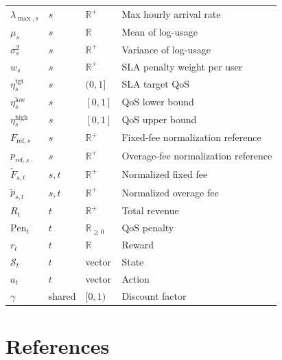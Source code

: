 \documentclass[11pt]{article}
\begin{document}
\begin{longtable}{@{}llll@{}}
$\lambda_{\max,s}$ & $s$ & $\mathbb{R}^{+}$ & Max hourly arrival rate \\
$\mu_s$ & $s$ & $\mathbb{R}$ & Mean of log-usage \\
$\sigma_s^2$ & $s$ & $\mathbb{R}^{+}$ & Variance of log-usage \\
$w_s$ & $s$ & $\mathbb{R}^{+}$ & SLA penalty weight per user \\
$\eta_s^{\mathrm{tgt}}$ & $s$ & $(0,1]$ & SLA target QoS \\
$\eta_s^{\mathrm{low}}$ & $s$ & $[0,1]$ & QoS lower bound \\
$\eta_s^{\mathrm{high}}$ & $s$ & $[0,1]$ & QoS upper bound \\
$F_{\mathrm{ref},s}$ & $s$ & $\mathbb{R}^{+}$ & Fixed-fee normalization reference \\
$p_{\mathrm{ref},s}$ & $s$ & $\mathbb{R}^{+}$ & Overage-fee normalization reference \\
$\tilde{F}_{s,t}$ & $s,t$ & $\mathbb{R}^{+}$ & Normalized fixed fee \\
$\tilde{p}_{s,t}$ & $s,t$ & $\mathbb{R}^{+}$ & Normalized overage fee \\
$R_t$ & $t$ & $\mathbb{R}^{+}$ & Total revenue \\
$\mathrm{Pen}_t$ & $t$ & $\mathbb{R}_{\ge 0}$ & QoS penalty \\
$r_t$ & $t$ & $\mathbb{R}$ & Reward \\
$\mathcal{S}_t$ & $t$ & vector & State \\
$a_t$ & $t$ & vector & Action \\
$\gamma$ & shared & $[0,1)$ & Discount factor \\
\bottomrule
\end{longtable}
\normalsize

\section{References}
\end{document}
